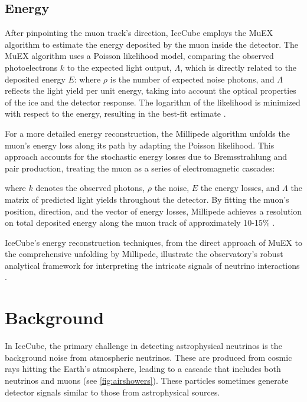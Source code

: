 \subsection{Energy}

After pinpointing the muon track's direction, IceCube employs the MuEX algorithm to estimate the energy deposited by the muon inside the detector.
The MuEX algorithm uses a Poisson likelihood model, comparing the observed photoelectrons $k$ to the expected light output, $\Lambda$, which is directly related to the deposited energy $E$:
\muEXLLH
where $\rho$ is the number of expected noise photons, and $\Lambda$ reflects the light yield per unit energy, taking into account the optical properties of the ice and the detector response.
The logarithm of the likelihood is minimized with respect to the energy, resulting in the best-fit estimate \cite{IC3_energyReco}.

For a more detailed energy reconstruction, the Millipede algorithm unfolds the muon's energy loss along its path by adapting the Poisson likelihood.
This approach accounts for the stochastic energy losses due to Bremsstrahlung and pair production, treating the muon as a series of electromagnetic cascades:
\vecMULLH
\LLHwithspice

where $k$ denotes the observed photons, $\rho$ the noise, $E$ the energy losses, and \textbf{$\Lambda$} the matrix of predicted light yields throughout the detector.
By fitting the muon's position, direction, and the vector of energy losses, Millipede achieves a resolution on total deposited energy along the muon track of approximately 10-15\% \cite{IC3_energyReco}.

IceCube's energy reconstruction techniques, from the direct approach of MuEX to the comprehensive unfolding by Millipede, illustrate the observatory's robust analytical framework for interpreting the intricate signals of neutrino interactions \cite{IC3_energyReco}.

\section{Background}

In IceCube, the primary challenge in detecting astrophysical neutrinos is the background noise from atmospheric neutrinos.
These are produced from cosmic rays hitting the Earth's atmosphere, leading to a cascade that includes both neutrinos and muons (see \cref{fig:airshowers}).
These particles sometimes generate detector signals similar to those from astrophysical sources.


